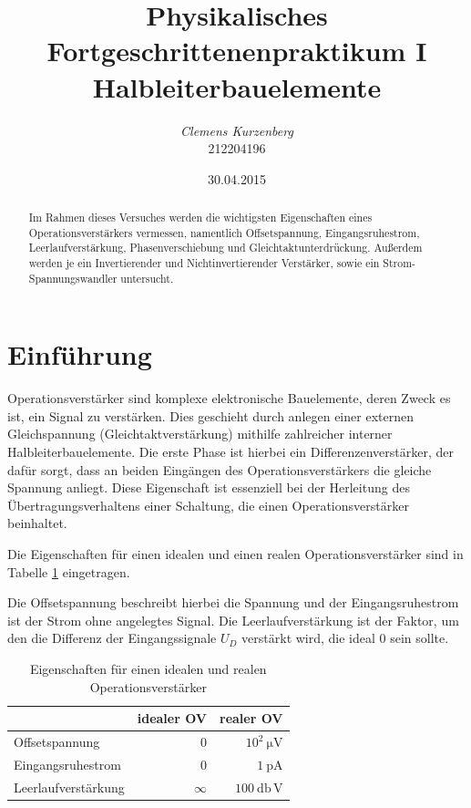 \documentclass[10pt,a4paper]{scrartcl}
\title {Physikalisches Fortgeschrittenenpraktikum I\linebreak
Halbleiterbauelemente}
\author {\emph{Clemens Kurzenberg}\\212204196}
\date {30.04.2015}
\begin{document}
\maketitle

\begin{abstract}
    Im Rahmen dieses Versuches werden die wichtigsten Eigenschaften eines
    Operationsverstärkers vermessen,
    namentlich Offsetspannung, Eingangsruhestrom, Leerlaufverstärkung,
    Phasenverschiebung und Gleichtaktunterdrückung.
    Außerdem werden je ein Invertierender und Nichtinvertierender Verstärker,
    sowie ein Strom-Spannungswandler untersucht.
\end{abstract}

\tableofcontents

\pagebreak
\listoffigures
\listoftables

\pagebreak
\section {Einführung}

Operationsverstärker sind komplexe elektronische Bauelemente,
deren Zweck es ist, ein Signal zu verstärken.
Dies geschieht durch anlegen einer externen Gleichspannung
(Gleichtaktverstärkung)
mithilfe zahlreicher interner Halbleiterbauelemente.
Die erste Phase ist hierbei ein Differenzenverstärker,
der dafür sorgt,
dass an beiden Eingängen des Operationsverstärkers die gleiche Spannung anliegt.
Diese Eigenschaft ist essenziell bei der Herleitung des Übertragungsverhaltens
einer Schaltung,
die einen Operationsverstärker beinhaltet.

Die Eigenschaften für einen idealen und einen realen Operationsverstärker
sind in Tabelle \ref{tab:OV_prop} eingetragen.

Die Offsetspannung beschreibt hierbei die Spannung
und der Eingangsruhestrom ist der Strom ohne angelegtes Signal.
Die Leerlaufverstärkung ist der Faktor,
um den die Differenz der Eingangssignale $U_D$ verstärkt wird,
die ideal $0$ sein sollte.

\begin{table}[!ht]
    \centering
    \caption{Eigenschaften für einen idealen und realen Operationsverstärker}
    \label{tab:OV_prop}
    \begin{tabular}{l|r|r}
        &idealer OV&realer OV\\
        \hline
        Offsetspannung&$0$&$10^2~\mathrm{\mu V}$\\
        Eingangsruhestrom&$0$&$1~\mathrm{pA}$\\
        Leerlaufverstärkung&$\infty$&$100~\mathrm{db\,V}$
    \end{tabular}
\end{table}
\end{document}
